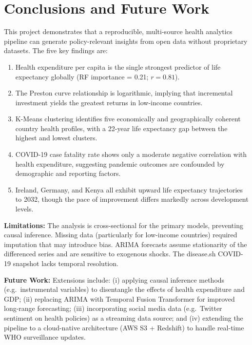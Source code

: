 \documentclass[conference]{IEEEtran}
\begin{document}
\section{Conclusions and Future Work}

This project demonstrates that a reproducible, multi-source health analytics
pipeline can generate policy-relevant insights from open data without
proprietary datasets. The five key findings are:

\begin{enumerate}
  \item Health expenditure per capita is the single strongest predictor of
    life expectancy globally (RF importance = 0.21; $r = 0.81$).
  \item The Preston curve relationship is logarithmic, implying that
    incremental investment yields the greatest returns in low-income
    countries.
  \item K-Means clustering identifies five economically and geographically
    coherent country health profiles, with a 22-year life expectancy gap
    between the highest and lowest clusters.
  \item COVID-19 case fatality rate shows only a moderate negative correlation
    with health expenditure, suggesting pandemic outcomes are confounded by
    demographic and reporting factors.
  \item Ireland, Germany, and Kenya all exhibit upward life expectancy
    trajectories to 2032, though the pace of improvement differs markedly
    across development levels.
\end{enumerate}

\textbf{Limitations:} The analysis is cross-sectional for the primary models,
preventing causal inference. Missing data (particularly for low-income
countries) required imputation that may introduce bias. ARIMA forecasts assume
stationarity of the differenced series and are sensitive to exogenous shocks.
The disease.sh COVID-19 snapshot lacks temporal resolution.

\textbf{Future Work:} Extensions include: (i) applying causal inference methods
(e.g.\ instrumental variables) to disentangle the effects of health expenditure
and GDP; (ii) replacing ARIMA with Temporal Fusion Transformer for improved
long-range forecasting; (iii) incorporating social media data (e.g.\ Twitter
sentiment on health policies) as a streaming data source; and (iv) extending
the pipeline to a cloud-native architecture (AWS S3 + Redshift) to handle
real-time WHO surveillance updates.
\end{document}
